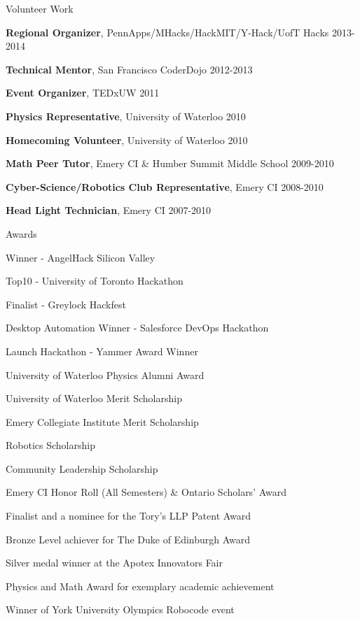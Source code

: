 \documentclass[10pt, oneside]{resume}
\begin{document}
  \begin{rSection}{Volunteer Work}

    \begin{rSubListing}
      \item {{\bfseries Regional Organizer}, PennApps/MHacks/HackMIT/Y-Hack/UofT Hacks \hfill 2013-2014}
      \item {{\bfseries Technical Mentor}, San Francisco CoderDojo \hfill 2012-2013}
      \item {{\bfseries Event Organizer}, TEDxUW \hfill 2011}
      \item {{\bfseries Physics Representative}, University of Waterloo \hfill 2010}
      \item {{\bfseries Homecoming Volunteer}, University of Waterloo \hfill 2010}
      \item {{\bfseries Math Peer Tutor}, Emery CI \& Humber Summit Middle School \hfill 2009-2010}
      \item {{\bfseries Cyber-Science/Robotics Club Representative}, Emery CI \hfill 2008-2010}
      \item {{\bfseries Head Light Technician}, Emery CI \hfill 2007-2010}
    \end{rSubListing}

  \end{rSection}


  \begin{rSection}{Awards}

    \begin{rSubListing}
      \item {Winner - AngelHack Silicon Valley}
      \item {Top10 - University of Toronto Hackathon}
      \item {Finalist - Greylock Hackfest }
      \item {Desktop Automation Winner - Salesforce DevOps Hackathon }
      \item {Launch Hackathon - Yammer Award Winner }
      \item {University of Waterloo Physics Alumni Award }
      \item {University of Waterloo Merit Scholarship }
      \item {Emery Collegiate Institute Merit Scholarship }
      \item {Robotics Scholarship }
      \item {Community Leadership Scholarship }
      \item {Emery CI Honor Roll (All Semesters) \& Ontario Scholars’ Award }
      \item {Finalist and a nominee for the Tory’s LLP Patent Award }
      \item {Bronze Level achiever for The Duke of Edinburgh Award }
      \item {Silver medal winner at the Apotex Innovators Fair }
      \item {Physics and Math Award for exemplary academic achievement }
      \item {Winner of York University Olympics Robocode event}
    \end{rSubListing}

  \end{rSection}
\end{document}
